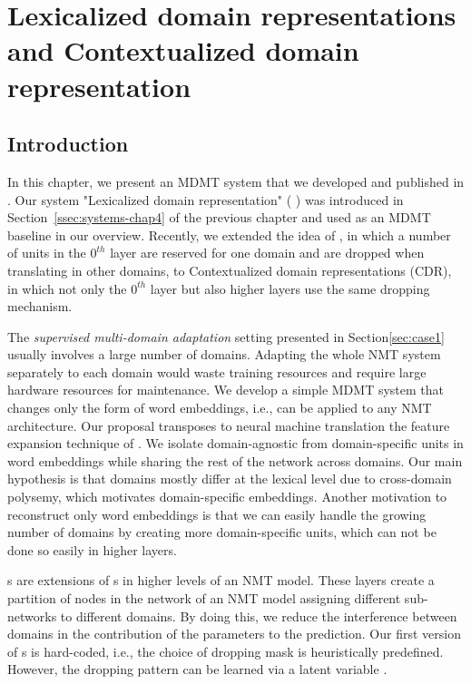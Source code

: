 \chapter{Lexicalized domain representations and Contextualized domain representation}
\label{chap:ldr}
\section{Introduction}
In this chapter, we present an MDMT system that we developed and published in \citet{Pham19generic}. Our system "Lexicalized domain representation" ( ) was introduced in Section~\ref{ssec:systems-chap4} of the previous chapter and used as an MDMT baseline in our overview. Recently, we extended the idea of , in which a number of units in the $0^{th}$ layer are reserved for one domain and are dropped when translating in other domains, to Contextualized domain representations (CDR), in which not only the $0^{th}$ layer but also higher layers use the same dropping mechanism.

The \emph{supervised multi-domain adaptation} setting presented in Section\ref{sec:case1} usually involves a large number of domains. Adapting the whole NMT system separately to each domain would waste training resources and require large hardware resources for maintenance. We develop a simple MDMT system that changes only the form of word embeddings, i.e., can be applied to any NMT architecture. Our proposal transposes to neural machine translation the feature expansion technique of \citet{Daume07frustratingly}. We isolate domain-agnostic from domain-specific units in word embeddings while sharing the rest of the network across domains. Our main hypothesis is that domains mostly differ at the lexical level due to cross-domain polysemy, which motivates domain-specific embeddings. Another motivation to reconstruct only word embeddings is that we can easily handle the growing number of domains by creating more domain-specific units, which can not be done so easily in higher layers.

s are extensions of s in higher levels of an NMT model. These layers create a partition of nodes in the network of an NMT model assigning different sub-networks to different domains. By doing this, we reduce the interference between domains in the contribution of the parameters to the prediction. Our first version of s is hard-coded, i.e., the choice of dropping mask is heuristically predefined. However, the dropping pattern can be learned via a latent variable \citet{Gong21pay,Gong21adaptive}.
 
